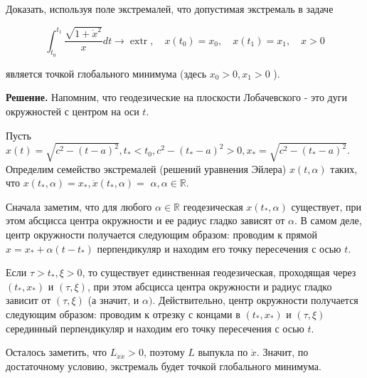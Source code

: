Доказать, используя поле экстремалей, что допустимая экстремаль в задаче

$$
\int_{t_{0}}^{t_{1}} \frac{\sqrt{1+\dot{x}^{2}}}{x} d t \rightarrow \operatorname{extr}, \quad x\left(t_{0}\right)=x_{0}, \quad x\left(t_{1}\right)=x_{1}, \quad x>0
$$

является точкой глобального минимума (здесь $x_{0}>0, x_{1}>0$ ).

\textbf{Решение.} Напомним, что геодезические на плоскости Лобачевского - это дуги окружностей с центром на оси $t$.

Пусть $\hat{x}(t)=\sqrt{c^{2}-(t-a)^{2}}, t_{*}<t_{0}, c^{2}-\left(t_{*}-a\right)^{2}>0, x_{*}=\sqrt{c^{2}-\left(t_{*}-a\right)^{2}}$. Определим семейство экстремалей (решений уравнения Эйлера) $x(t, \alpha)$ таких, что $x\left(t_{*}, \alpha\right)=x_{*}, \dot{x}\left(t_{*}, \alpha\right)=$ $\alpha, \alpha \in \mathbb{R}$.

Сначала заметим, что для любого $\alpha \in \mathbb{R}$ геодезическая $x\left(t_{*}, \alpha\right)$ существует, при этом абсцисса центра окружности и ее радиус гладко зависят от $\alpha$. В самом деле, центр окружности получается следующим образом: проводим к прямой $x=x_{*}+\alpha\left(t-t_{*}\right)$ перпендикуляр и находим его точку пересечения с осью $t$.

Если $\tau>t_{*}, \xi>0$, то существует единственная геодезическая, проходящая через $\left(t_{*}, x_{*}\right)$ и $(\tau, \xi)$, при этом абсцисса центра окружности и радиус гладко зависит от $(\tau, \xi)$ (а значит, и $\alpha)$. Действительно, центр окружности получается следующим образом: проводим к отрезку с концами в $\left(t_{*}, x_{*}\right)$ и $(\tau, \xi)$ серединный перпендикуляр и находим его точку пересечения с осью $t$.

Осталось заметить, что $L_{\dot{x} \dot{x}}>0$, поэтому $L$ выпукла по $\dot{x}$. Значит, по достаточному условию, экстремаль будет точкой глобального минимума.